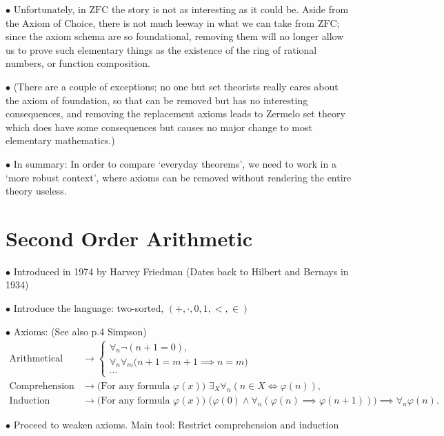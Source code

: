\documentclass{article}
\theoremstyle{nonumberplain}
\newcommand{\ZFC}{\mathrm{ZFC}}
\newcommand\point[1]{\noindent \hspace{\labelsep} $\bullet$ #1 \smallskip}
\newcommand\timestamp[1]{}
\begin{document}
\point{Unfortunately, in $\ZFC$ the story is not as interesting as it could be. Aside from the Axiom of Choice, there is not much leeway in what we can take from $\ZFC$; since the axiom schema are so foundational, removing them will no longer allow us to prove such elementary things as the existence of the ring of rational numbers, or function composition.}

\point{(There are a couple of exceptions; no one but set theorists really cares about the axiom of foundation, so that can be removed but has no interesting consequences, and removing the replacement axioms leads to Zermelo set theory which does have some consequences but causes no major change to most elementary mathematics.)}

\point{In summary: In order to compare `everyday theorems', we need to work in a `more robust context', where axioms can be removed without rendering the entire theory useless.}

\timestamp{10 minutes}

\section{Second Order Arithmetic}

\point{Introduced in 1974 by Harvey Friedman (Dates back to Hilbert and Bernays in 1934)}

\point{Introduce the language: two-sorted, $(+,\cdot,0,1,<,\in)$}

\point{Axioms: (See also p.4 Simpson)}
\begin{equation}
\begin{aligned}
\text{Arithmetical Axioms} &\rightarrow \begin{cases}
\forall_n \neg (n+1 = 0),\\
\forall_n \forall_m \big( n+1 = m+1 \implies n=m \big)\\
\cdots
\end{cases}\\
\text{Comprehension} &\rightarrow \text{(For any formula $\varphi(x)$) } \exists_X \forall_n (n \in X \iff \varphi(n)),\\
\text{Induction} &\rightarrow \text{(For any formula $\varphi(x)$) } \big(\varphi(0) \land \forall_n (\varphi(n) \implies \varphi(n+1)) \big) \implies \forall_n \varphi(n).
\end{aligned}
\end{equation}

\point{Proceed to weaken axioms. Main tool: Restrict comprehension and induction}
\end{document}
